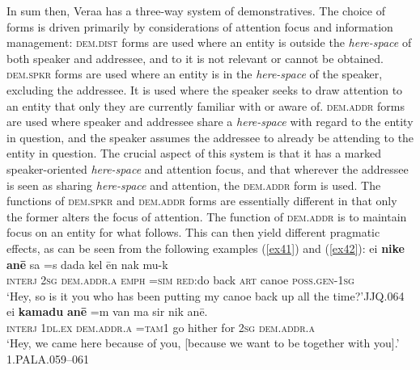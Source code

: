 \documentclass[output=paper
,modfonts
,nonflat]{langsci/langscibook}
\begin{document}
In sum then, Vera{\textquotesingle}a has a three-way system of demonstratives. The choice of forms is driven primarily by considerations of attention focus and information management: \textsc{dem.dist} forms are used where an entity is outside the \textit{here-space} of both speaker and addressee, and  to it is not relevant or cannot be obtained. \textsc{dem.spkr} forms are used where an entity is in the \textit{here-space} of the speaker, excluding the addressee. It is used where the speaker seeks to draw attention to an entity that only they are currently familiar with or aware of. \textsc{dem.addr} forms are used where speaker and addressee share a \textit{here-space} with regard to the entity in question, and the speaker assumes the addressee to already be attending to the entity in question. The crucial aspect of this system is that it has a marked speaker-oriented \textit{here-space} and attention focus, and that wherever the addressee is seen as sharing \textit{here-space} and attention, the \textsc{dem.addr} form is used.  The functions of \textsc{dem.spkr} and \textsc{dem.addr} forms are essentially different in that only the former alters the focus of attention. The function of \textsc{dem.addr} is to maintain  focus on an entity for what follows. This can then yield different pragmatic effects, as can be seen from the following examples (\ref{ex41}) and (\ref{ex42}): 
\ea	\label{ex41}
\gll		ei			\textbf{nike}	\textbf{an\=e}		sa		=s	dada		kel			\=en		nak		mu-k\\
		\textsc{interj}	\textsc{2sg}	\textsc{dem.addr.a}	\textsc{emph}	\textsc{=sim}	\textsc{red:}do	back		\textsc{art}		canoe	\textsc{poss.gen-1sg}\\
\glt	`Hey, so is it you who has been putting my canoe back up all the time?'\hfill{JJQ.064}
\z
\ea	\label{ex42}
\gll	{\textquotesingle}ei			\textbf{kamadu}	\textbf{an\=e}		=m		van	ma 				sir 	nik 	an\=e.		\\
		\textsc{interj}	\textsc{1dl.ex}			\textsc{dem.addr.a}	\textsc{=tam1}	go		hither		for	\textsc{2sg}		\textsc{dem.addr.a}	\\
\glt	`Hey, we came here because of you, [because we want to be together with you].'\\\hfill{1.PALA.059--061}
\z
\end{document}
